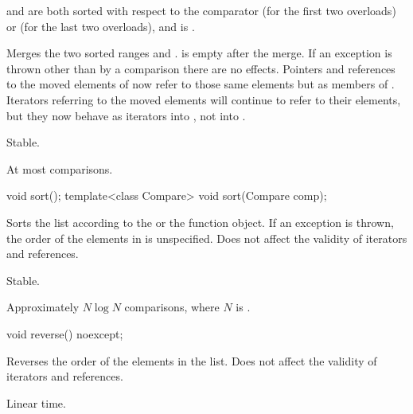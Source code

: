 \begin{itemdescr}
\pnum
\expects
{} and  are both sorted with respect to
the comparator  (for the first two overloads) or
 (for the last two overloads), and
 is .

\pnum
\effects
Merges the two sorted ranges \tcode{[begin(), end())} and
\tcode{[x.begin(), x.end())}.  is empty after the merge. If an
exception is thrown other than by a comparison there are no effects.
Pointers and references to the moved elements of  now refer to those same elements
but as members of . Iterators referring to the moved elements will continue to
refer to their elements, but they now behave as iterators into , not into
.

\pnum
\remarks
Stable.

\pnum
\complexity
At most  comparisons.
\end{itemdescr}

%
\begin{itemdecl}
void sort();
template<class Compare> void sort(Compare comp);
\end{itemdecl}

\begin{itemdescr}
\pnum
\effects
Sorts the list according to the  or the  function object.
If an exception is thrown, the order of the elements in  is unspecified.
Does not affect the validity of iterators and references.

\pnum
\remarks
Stable.

\pnum
\complexity
Approximately $N \log N$ comparisons, where $N$ is .
\end{itemdescr}

%
\begin{itemdecl}
void reverse() noexcept;
\end{itemdecl}

\begin{itemdescr}
\pnum
\effects
Reverses the order of the elements in the list.
Does not affect the validity of iterators and references.

\pnum
\complexity
Linear time.
\end{itemdescr}

